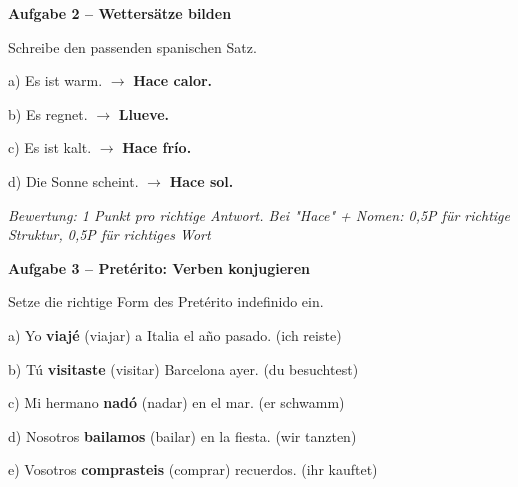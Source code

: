 \documentclass[11pt, a4paper]{article}
\newcommand{\fachfarbe}{spanisch}
\newcommand{\punktebox}[1]{\hfill\fbox{\small \_/#1}}
\newcommand{\lsg}[1]{\textcolor{loesung}{\textbf{#1}}}
\newenvironment{aufgabe}[1]{%
    \needspace{5\baselineskip}%
    \nopagebreak[4]%
    \vspace{10pt}
    \noindent\textbf{\textcolor{\fachfarbe}{Aufgabe #1}}
    \nopagebreak[4]%
    \vspace{5pt}
    \nopagebreak[4]%
    \begin{list}{}{\leftmargin=0pt}
    \item[]
}{%
    \end{list}
}
\begin{document}
\begin{aufgabe}{2 -- Wettersätze bilden}
Schreibe den passenden spanischen Satz. \punktebox{4}
\end{aufgabe}

\noindent
a) Es ist warm. $\rightarrow$ \lsg{Hace calor.}

\vspace{0.8em}

\noindent
b) Es regnet. $\rightarrow$ \lsg{Llueve.}

\vspace{0.8em}

\noindent
c) Es ist kalt. $\rightarrow$ \lsg{Hace frío.}

\vspace{0.8em}

\noindent
d) Die Sonne scheint. $\rightarrow$ \lsg{Hace sol.}

\textit{\textcolor{grau}{Bewertung: 1 Punkt pro richtige Antwort. Bei "Hace" + Nomen: 0,5P für richtige Struktur, 0,5P für richtiges Wort}}

\vspace{15pt}


\begin{aufgabe}{3 -- Pretérito: Verben konjugieren}
Setze die richtige Form des Pretérito indefinido ein. \punktebox{6}
\end{aufgabe}

\noindent
a) Yo \lsg{viajé} (viajar) a Italia el año pasado. \hfill (ich reiste)

\vspace{0.8em}

\noindent
b) Tú \lsg{visitaste} (visitar) Barcelona ayer. \hfill (du besuchtest)

\vspace{0.8em}

\noindent
c) Mi hermano \lsg{nadó} (nadar) en el mar. \hfill (er schwamm)

\vspace{0.8em}

\noindent
d) Nosotros \lsg{bailamos} (bailar) en la fiesta. \hfill (wir tanzten)

\vspace{0.8em}

\noindent
e) Vosotros \lsg{comprasteis} (comprar) recuerdos. \hfill (ihr kauftet)
\end{document}
